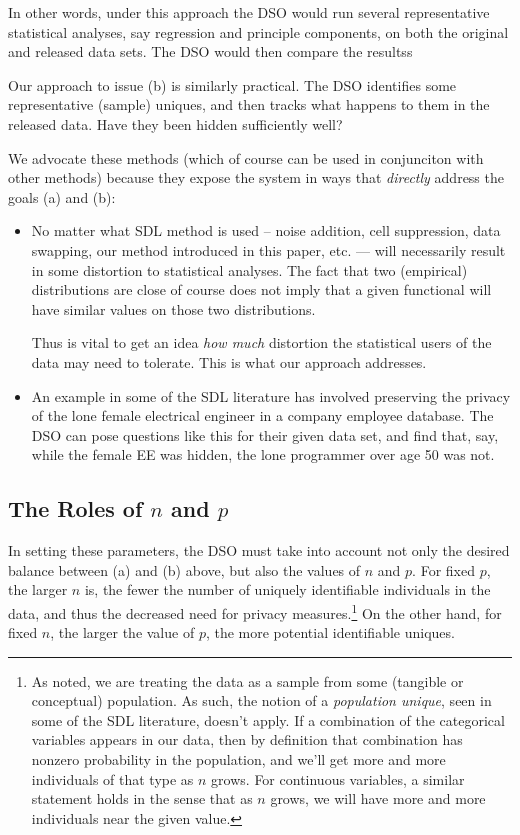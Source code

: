 \documentclass[11pt]{article}
\begin{document}
In other words, under this approach the DSO would run several
representative statistical analyses, say regression and principle
components, on both the original and released data sets.  The DSO would
then compare the resultss 

Our approach to issue (b) is similarly practical.  The DSO identifies
some representative (sample) uniques, and then tracks what happens to
them in the released data.  Have they been hidden sufficiently well?

We advocate these methods (which of course can be used in conjunciton
with other methods) because they expose the system in ways that {\it
directly} address the goals (a) and (b):

\begin{itemize}

\item No matter what SDL method is used -- noise addition, cell
suppression, data swapping, our method introduced in this paper, etc.
--- will necessarily result in some distortion to statistical analyses.
The fact that two (empirical) distributions are close  of course does
not imply that a given functional will have similar values on those two
distributions.

Thus is vital to get an idea {\it how much} distortion the statistical
users of the data may need to tolerate.  This is what our approach
addresses.

\item An example in some of the SDL literature has involved preserving
the privacy of the lone female electrical engineer in a company
employee database.  The DSO can pose questions like this for their given
data set, and find that, say,  while the female EE was hidden, the lone
programmer over age 50 was not.

\end{itemize}

\subsection{The Roles of $n$ and $p$}

In setting these parameters, the DSO must take into account not only the
desired balance between (a) and (b) above, but also the values of $n$
and $p$.  For fixed $p$, the larger $n$ is, the fewer the number of
uniquely identifiable individuals in the data, and thus the decreased
need for privacy measures.\footnote{As noted, we are treating the data
as a sample from some (tangible or conceptual) population.  As such, the
notion of a {\it population unique}, seen in some of the SDL literature,
doesn't apply.  If a combination of the categorical variables appears in
our data, then by definition that combination has nonzero probability in
the population, and we'll get more and more individuals of that type as
$n$ grows.  For continuous variables, a similar statement holds in the
sense that as $n$ grows, we will have more and more individuals near the
given value.} On the other hand, for fixed $n$, the larger the value of
$p$, the more potential identifiable uniques.
\end{document}
